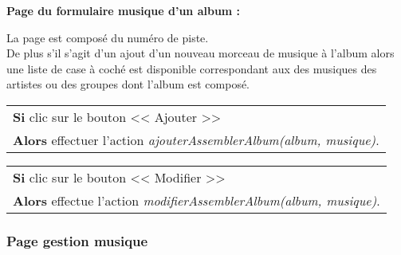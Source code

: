         
            \begin{paragraphe}
                \textbf{Page du formulaire musique d'un album :}
            \end{paragraphe}
            
            \begin{paragraphe}
                La page est composé du numéro de piste. \\
                De plus s'il s'agit d'un ajout d'un nouveau morceau de musique à l'album alors une liste de case à coché est disponible correspondant aux des musiques des artistes ou des groupes dont l'album est composé.
            \end{paragraphe}
            
            \begin{center}
                \begin{tabular}{l}
                    \textbf{Si} clic sur le bouton << Ajouter >> \\
                    \textbf{Alors} effectuer l'action \emph{ajouterAssemblerAlbum(album, musique)}.
                \end{tabular}
            \end{center}
            
            
        \clearpage
            
            \begin{center}
                \begin{tabular}{l}
                    \textbf{Si} clic sur le bouton << Modifier >> \\
                    \textbf{Alors} effectue l'action \emph{modifierAssemblerAlbum(album, musique)}.
                \end{tabular}
            \end{center}
            
        
    \newpage

		\subsubsection{Page gestion musique}


